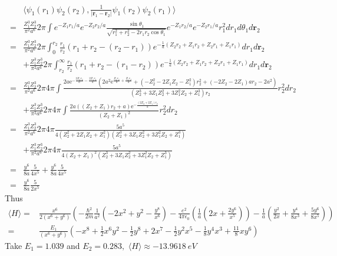 \begin{align*}
    &\langle
    \psi_1(r_1)\psi_2(r_2),
    \frac{1}{|\bm r_1-\bm r_2|}
    \psi_1(r_2)\psi_2(r_1)
    \rangle\\=&
    \frac{Z_1^3Z_2^3}{\pi^2a^6}
    2\pi
    \int
    e^{-Z_1r_1/a}
    e^{-Z_2r_2/a}
    \frac{\sin\theta_1}{\sqrt{r_1^2+r_2^2-2r_1r_2\cos\theta_1}}
    e^{-Z_1r_2/a}
    e^{-Z_2r_1/a}
    r_1^2 dr_1d\theta_1 d\bm r_2\\
    =&
    \frac{Z_1^3Z_2^3}{\pi^2a^6}
    2\pi
    \int_0^{r_2}
    \frac{r_1}{r_2} 
    (r_1+r_2 - (r_2-r_1)) 
    e^{-\frac{1}{a}(Z_2r_2+Z_1r_2+Z_2r_1+Z_1r_1)}
    dr_1d\bm r_2\\
    &+
    \frac{Z_1^3Z_2^3}{\pi^2a^6}
    2\pi
    \int_{r_2}^\infty
    \frac{r_1}{r_2}(r_1+r_2 - (r_1-r_2)) e^{-\frac{1}{a}(Z_2r_2+Z_1r_2+Z_2r_1+Z_1r_1)}
    dr_1d\bm r_2\\
    =&
    \frac{Z_1^3Z_2^3}{\pi^2a^6}
    2\pi 4\pi
    \int \frac{2a\mathrm{e}^{-\frac{2Z_{2} r_{2}}{a} - \frac{2Z_{1} r_{2}}{a}} \left(2a^{2} \mathrm{e}^{\frac{Z_{2} r_{2}}{a} + \frac{Z_{1} r_{2}}{a}} + \left(-Z_{2}^{2} - 2Z_{1} Z_{2} - Z_{1}^{2}\right) r_{2}^{2} + \left(-2Z_{2} - 2Z_{1}\right) ar_{2} - 2a^{2}\right)}{\left(Z_{2}^{3} + 3Z_{1} Z_{2}^{2} + 3Z_{1}^{2} Z_{2} + Z_{1}^{3}\right) r_{2}} r_2^2dr_2
    \\&+
    \frac{Z_1^3Z_2^3}{\pi^2a^6}
    2\pi4\pi 
    \int 
   \frac{2a \left(\left(Z_{2} + Z_{1}\right) r_{2} + a\right) \mathrm{e}^{-\frac{\left(2Z_{2} + 2Z_{1}\right) r_{2}}{a}}}{\left(Z_{2} + Z_{1}\right)^{2}}
    r_2^2dr_2\\
    =&
    \frac{Z_1^3Z_2^3}{\pi^2a^6}
    2\pi 4\pi
    \frac{5a^{5}}{4 \left(Z_{2}^{2} + 2Z_{1} Z_{2} + Z_{1}^{2}\right) \left(Z_{2}^{3} + 3Z_{1} Z_{2}^{2} + 3Z_{1}^{2} Z_{2} + Z_{1}^{3}\right)}\\
    &+
    \frac{Z_1^3Z_2^3}{\pi^2a^6}
    2\pi 4\pi
    \frac{5a^{5}}{4 \left(Z_{2} + Z_{1}\right)^{2} \left(Z_{2}^{3} + 3Z_{1} Z_{2}^{2} + 3Z_{1}^{2} Z_{2} + Z_{1}^{3}\right)}\\
    =&
    \frac{y^6}{8a}\frac{5}{4x^5}
    +
    \frac{y^6}{8a}\frac{5}{4x^5}\\
    =&
    \frac{y^6}{8a}\frac{5}{2x^5}
\end{align*}
Thus 
\begin{align*}
    \langle H\rangle=&
    \frac{x^6}{2(x^6+y^6)}\left(
    -\frac{\hbar^2}{2m}
    \frac{1}{a^2}\left(
    -2x^2+y^2-\frac{y^8}{x^6}
    \right)
    -\frac{e^2}{4\pi\epsilon_0}
    \left(
    \frac{1}{a}\left(2x + \frac{2y^6}{x^5}\right)
    \right)
    -
    \frac{1}{a}
    \left(
    \frac{y^2}{2x}
    +\frac{y^4}{8x^3}
    +
    \frac{5y^6}{8x^5}
    \right)
    \right)\\
    =&
    \frac{E_1}{(x^6+y^6)}\left(
    -x^8+\frac{1}{2}x^6y^2-\frac{1}{2}y^8
    +2x^7 
    -
    \frac{1}{2}y^2x^5
    -\frac{1}{8}y^4x^3
    +
    \frac{11}{8}xy^6
    \right)
\end{align*}
Take $E_1=1.039$ and $E_2=0.283,$ 
$\langle H\rangle\approx -\qty{13.9618}{eV}$

